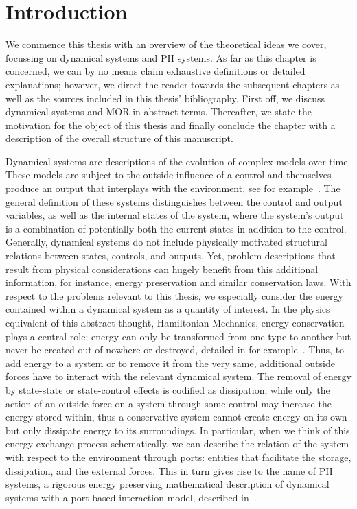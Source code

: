 \chapter{Introduction}\label{chap:introduction}

We commence this thesis with an overview of the theoretical ideas we cover, focussing on dynamical systems and \ac{PH} systems.
As far as this chapter is concerned, we can by no means claim exhaustive definitions or detailed explanations; however, we direct the reader towards the subsequent chapters as well as the sources included in this thesis' bibliography.
First off, we discuss dynamical systems and \ac{MOR} in abstract terms.
Thereafter, we state the motivation for the object of this thesis and finally conclude the chapter with a description of the overall structure of this manuscript.

Dynamical systems are descriptions of the evolution of complex models over time.
These models are subject to the outside influence of a control and themselves produce an output that interplays with the environment, see for example~\cite{Hinrichsen2005}.
The general definition of these systems distinguishes between the control and output variables, as well as the internal states of the system, where the system's output is a combination of potentially both the current states in addition to the control.
Generally, dynamical systems do not include physically motivated structural relations between states, controls, and outputs.
Yet, problem descriptions that result from physical considerations can hugely benefit from this additional information, for instance, energy preservation and similar conservation laws.
With respect to the problems relevant to this thesis, we especially consider the energy contained within a dynamical system as a quantity of interest.
In the physics equivalent of this abstract thought, Hamiltonian Mechanics, energy conservation plays a central role: energy can only be transformed from one type to another but never be created out of nowhere or destroyed, detailed in for example~\cite{Taylor2005, Giorgilli2022}.
Thus, to add energy to a system or to remove it from the very same, additional outside forces have to interact with the relevant dynamical system.
The removal of energy by state-state or state-control effects is codified as dissipation, while only the action of an outside force on a system through some control may increase the energy stored within, thus a conservative system cannot create energy on its own but only dissipate energy to its surroundings.
In particular, when we think of this energy exchange process schematically, we can describe the relation of the system with respect to the environment through ports: entities that facilitate the storage, dissipation, and the external forces.
This in turn gives rise to the name of \ac{PH} systems, a rigorous energy preserving mathematical description of dynamical systems with a port-based interaction model, described in~\cite{Duindam2009, Jacob2012, VanDerSchaft2014, Mehrmann2023}.

